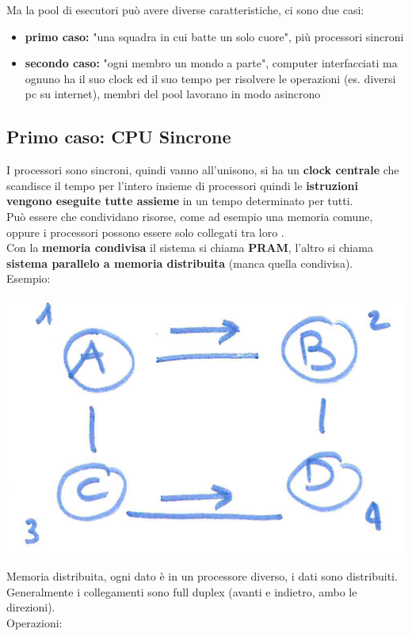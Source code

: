 Ma la pool di esecutori può avere diverse caratteristiche, ci sono due casi: 
\begin{itemize}
	\item \textbf{primo caso:} "una squadra in cui batte un solo cuore", più processori sincroni
	\item \textbf{secondo caso:} "ogni membro un mondo a parte", computer interfacciati ma ognuno ha il suo clock ed il suo tempo per risolvere le operazioni (es. diversi pc su internet), membri del pool lavorano in modo asincrono 
\end{itemize}


\subsection*{Primo caso: CPU Sincrone}
I processori sono sincroni, quindi vanno all'unisono, si ha un \textbf{clock centrale} che scandisce il tempo per l'intero insieme di processori quindi le \textbf{istruzioni vengono eseguite tutte assieme} in un tempo determinato per tutti.\\
Può essere che condividano risorse, come ad esempio una memoria comune, oppure i processori possono essere solo collegati tra loro .\\

Con la \textbf{memoria condivisa} il sistema si chiama \textbf{PRAM}, l'altro si chiama \textbf{sistema parallelo a memoria distribuita} (manca quella condivisa).\\

Esempio: 
\begin{center}
	\includegraphics[width=0.6\columnwidth]{img/somm1}
\end{center}
Memoria distribuita, ogni dato è in un processore diverso, i dati sono distribuiti. Generalmente i collegamenti sono full duplex (avanti e indietro, ambo le direzioni).\\

Operazioni: 

